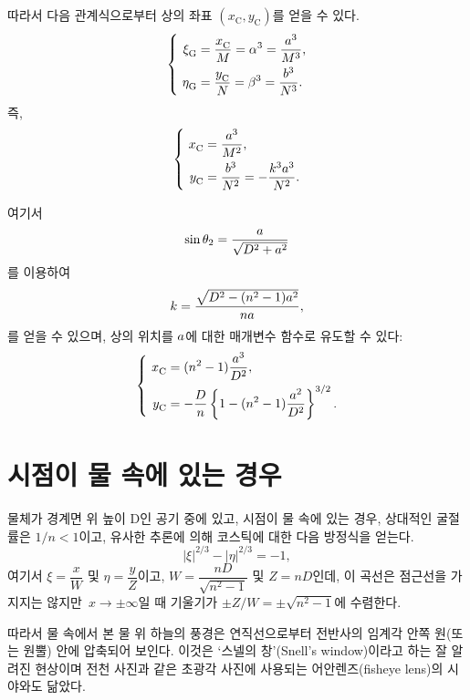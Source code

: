 \documentclass[twocolumn]{article}
\begin{document}
따라서 다음 관계식으로부터 상의 좌표 $(x_{\mathrm{C}}^{}, y_{\mathrm{C}}^{})$를 얻을 수 있다.
$$ \left\{ 
\begin{aligned}
	\xi_{\mathrm{G}}^{} &= \dfrac{x_{\mathrm{C}}^{}}{M} = \greeka^3 = \dfrac{\romana^3}{M^3},\\
	\eta_{\mathrm{G}}^{} &= \dfrac{y_{\mathrm{C}}^{}}{N} = \greekb^3 = \dfrac{\romanb^3}{N^3}.
\end{aligned}
\right.$$
즉,
$$ \left\{ 
\begin{aligned}
	x_{\mathrm{C}}^{} &= \dfrac{\romana^3}{M^2},\\
	y_{\mathrm{C}}^{} &= \dfrac{\romanb^3}{N^2}=-\dfrac{k^3\romana^3}{N^2}.
\end{aligned}
\right.$$

여기서
	$$\sin\theta_2 = \dfrac{{a}}{\sqrt{D^2+{a}^2}}$$
를 이용하여
$$k = \dfrac{\sqrt{D^2-(n^2-1){a}^2}}{n{a}},$$
를 얻을 수 있으며, 
상의 위치를 ${a}$에 대한 매개변수 함수로 유도할 수 있다:
$$ \left\{ 
\begin{aligned}
	x_{\mathrm{C}}^{} &= (n^2-1)\dfrac{\romana^3}{D^2},\\
	y_{\mathrm{C}}^{}
	&= -\dfrac{D}{n}\left\{ 1-(n^2-1)\dfrac{\romana^2}{D^2} \right\}^{3/2}.
\end{aligned}
\right.$$
	
\section{시점이 물 속에 있는 경우}

물체가 경계면 위 높이 D인 공기 중에 있고, 
시점이 물 속에 있는 경우, 상대적인 굴절률은 $1/n < 1$이고, 
유사한 추론에 의해 코스틱에 대한 다음 방정식을 얻는다.
$$ \left| \xi \right|^{2/3} - \left| \eta \right|^{2/3} = -1, $$
여기서 $\xi = \dfrac{x}{W} $ 및 $\eta = \dfrac{y}{Z}$이고, 
$W = \dfrac{nD}{\sqrt{n^2-1}}$ 및 $Z = nD$인데,  이 곡선은 점근선을 가지지는 않지만 $x\rightarrow\pm\infty$일 때 기울기가 $\pm Z/W = \pm \sqrt{n^2-1}$에 수렴한다.

따라서 물 속에서 본 물 위 하늘의 풍경은
연직선으로부터 전반사의 임계각 안쪽 원(또는 원뿔) 안에 압축되어 보인다. 이것은 
`스넬의 창'(Snell's window)이라고 하는 잘 알려진 현상이며 전천 사진과 같은 초광각 
사진에 사용되는 어안렌즈(fisheye lens)의 시야와도 닮았다.
\end{document}

